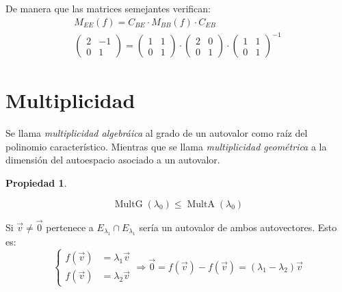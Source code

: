 \documentclass[a5paper,12pt,twoside]{book}
\newtheorem{prop}{{Propiedad}}[chapter]
\begin{document}
\begin{mdframed}[style=ExampleFrame]
    De manera que las matrices semejantes verifican:
    \begin{gather*}
        M_{EE}(f) = C_{BE} \cdot M_{BB}(f) \cdot C_{EB}
        \\
        \begin{pmatrix}
            2 & -1
            \\
            0 & 1
        \end{pmatrix}
        =
        \begin{pmatrix}
            1 & 1
            \\
            0 & 1
        \end{pmatrix}
        \cdot
        \begin{pmatrix}
            2 & 0
            \\
            0 & 1
        \end{pmatrix}
        \cdot
        \begin{pmatrix}
            1 & 1
            \\
            0 & 1
        \end{pmatrix}^{-1}
    \end{gather*}
\end{mdframed}


\section{Multiplicidad}

Se llama \emph{multiplicidad algebráica} al grado de un autovalor como raíz del polinomio característico.
Mientras que se llama \emph{multiplicidad geométrica} a la dimensión del autoespacio asociado a un autovalor.

\begin{mdframed}[style=PropertyFrame]
    \begin{prop}
    \end{prop}
    \begin{equation*}
        \operatorname{MultG} (\lambda_0) \leq \operatorname{MultA} (\lambda_0)
    \end{equation*}
\end{mdframed}

Si $\Vec{v} \neq \Vec{0}$ pertenece a $E_{\lambda_1} \cap E_{\lambda_1}$ sería un autovalor de ambos autovectores.
Esto es:
\begin{equation*}
    \left\{
    \begin{aligned}
        f(\Vec{v}) &= \lambda_1 \Vec{v}
        \\
        f(\Vec{v}) &= \lambda_2 \Vec{v}
    \end{aligned}
    \right.
    \Rightarrow \Vec{0} = f(\Vec{v}) - f(\Vec{v}) = \left( \lambda_1-\lambda_2 \right) \Vec{v}
\end{equation*}
\end{document}
